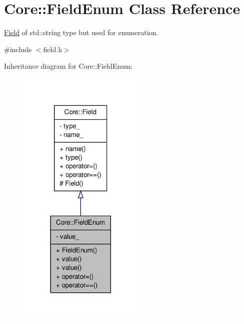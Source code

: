 \hypertarget{classCore_1_1FieldEnum}{
\section{Core::FieldEnum Class Reference}
\label{d3/db7/classCore_1_1FieldEnum}
}


\hyperlink{classCore_1_1Field}{Field} of std::string type but used for enumeration.  




{\ttfamily \#include $<$field.h$>$}



Inheritance diagram for Core::FieldEnum:
\nopagebreak
\begin{figure}[H]
\begin{center}
\leavevmode
\includegraphics[width=170pt]{d1/d93/classCore_1_1FieldEnum__inherit__graph}
\end{center}
\end{figure}


